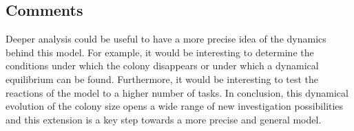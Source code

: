 \subsection{Comments}

Deeper analysis could be useful to have a more precise idea of the
dynamics behind this model. For example, it would be interesting to
determine the conditions under which the colony disappears or under
which a dynamical equilibrium can be found. Furthermore, it would
be interesting to test the reactions of the model to a higher number
of tasks. In conclusion, this dynamical evolution of the colony size
opens a wide range of new investigation possibilities and this extension
is a key step towards a more precise and general model.
%

 

